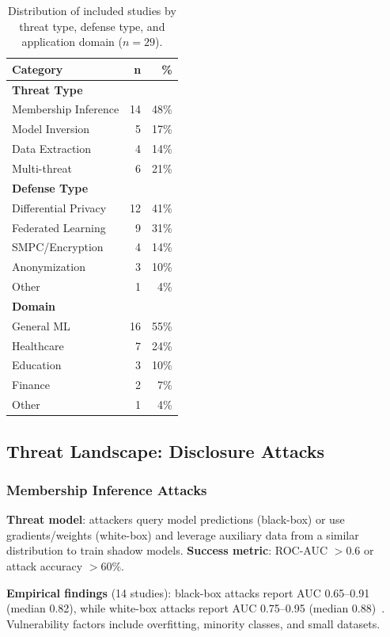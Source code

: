 \documentclass[conference]{IEEEtran}
\begin{document}
\begin{table}[!t]
\centering
\small
\begin{tabular}{l r r}
\toprule
\textbf{Category} & \textbf{n} & \textbf{\%} \\
\midrule
\textbf{Threat Type} & & \\
Membership Inference & 14 & 48\% \\
Model Inversion & 5 & 17\% \\
Data Extraction & 4 & 14\% \\
Multi-threat & 6 & 21\% \\
\midrule
\textbf{Defense Type} & & \\
Differential Privacy & 12 & 41\% \\
Federated Learning & 9 & 31\% \\
SMPC/Encryption & 4 & 14\% \\
Anonymization & 3 & 10\% \\
Other & 1 & 4\% \\
\midrule
\textbf{Domain} & & \\
General ML & 16 & 55\% \\
Healthcare & 7 & 24\% \\
Education & 3 & 10\% \\
Finance & 2 & 7\% \\
Other & 1 & 4\% \\
\bottomrule
\end{tabular}
\caption{Distribution of included studies by threat type, defense type, and application domain ($n=29$).}
\label{tab:distribution}
\end{table}

\subsection{Threat Landscape: Disclosure Attacks}

\subsubsection{Membership Inference Attacks}
\textbf{Threat model}: attackers query model predictions (black-box) or use gradients/weights (white-box) and leverage auxiliary data from a similar distribution to train shadow models. \textbf{Success metric}: ROC-AUC $>0.6$ or attack accuracy $>60\%$.

\textbf{Empirical findings} (14 studies): black-box attacks report AUC 0.65--0.91 (median 0.82), while white-box attacks report AUC 0.75--0.95 (median 0.88)~\cite{shokri2017membership,nasr2019comprehensive}. Vulnerability factors include overfitting, minority classes, and small datasets.
\end{document}
